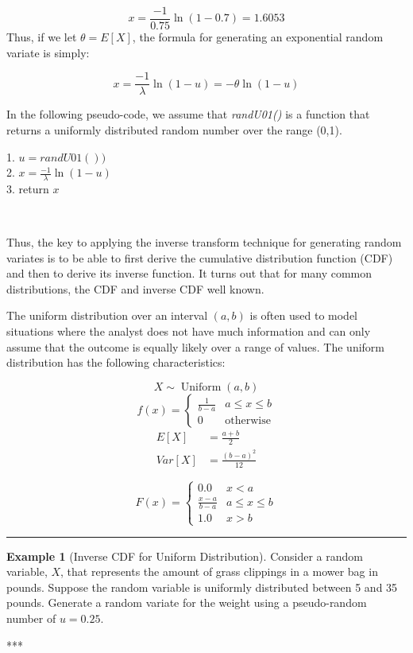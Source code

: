 \documentclass[
]{book}
\theoremstyle{definition}
\theoremstyle{definition}
\newtheorem{example}{Example}[chapter]
\theoremstyle{definition}
\theoremstyle{definition}
\theoremstyle{remark}
\begin{document}
\[x = \frac{-1}{0.75}\ln \left(1-0.7 \right) = 1.6053\]
Thus, if we let \(\theta = E\left[X\right]\), the formula for generating an exponential random variate is simply:

\begin{equation}
x = \frac{-1}{\lambda}\ln \left(1-u \right) = -\theta \ln{(1-u)}
\label{eq:expRV}
\end{equation}

In the following pseudo-code, we assume that \emph{randU01()} is a function that returns a uniformly distributed random number over the range (0,1).

1. \(u = randU01())\)\\
2. \(x = \frac{-1}{\lambda}\ln \left(1-u \right)\)\\
3. return \(x\)

~

Thus, the key to applying the inverse transform technique for generating random variates is to be able to first derive the cumulative distribution function (CDF) and then to derive its inverse function. It turns out that for many common distributions, the CDF and inverse CDF well known.

The uniform distribution over an interval \((a,b)\) is often used to model situations
where the analyst does not have much information and can only assume
that the outcome is equally likely over a range of values. The uniform
distribution has the following characteristics:

\[X \sim \operatorname{Uniform}(a,b)\]
\[
f(x) =
\begin{cases}
\frac{1}{b-a    } & a \leq x \leq b\\
0   & \text{otherwise}
\end{cases}
\]
\[
\begin{split}
E\left[X\right] &= \frac{a+b}{2}\\
Var\left[X\right] &= \frac{(b-a)^{2}}{12}
\end{split}
\]

\[
F(x) =
\begin{cases}
0.0 &  x < a\\
\frac{x-a}{b-a} & a \leq x \leq b\\
1.0 &  x > b
\end{cases}
\]

\begin{center}\rule{0.5\linewidth}{0.5pt}\end{center}

\begin{example}[Inverse CDF for Uniform Distribution]
\protect\hypertarget{exm:UnifInvCDF}{}{\label{exm:UnifInvCDF} {} }Consider a random variable, \(X\), that represents the amount of grass clippings in a mower bag in pounds. Suppose the random variable is uniformly distributed between 5 and 35 pounds. Generate a random variate for the weight using a pseudo-random number of \(u = 0.25\).
\end{example}
***
\end{document}
